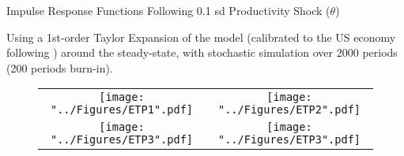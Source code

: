 \documentclass[compress,xcolor=dvipsnames]{beamer}
\begin{document}
\begin{frame}
\begin{footnotesize}
Impulse Response Functions Following 0.1 sd Productivity Shock ($\theta$)\\ \vspace{1mm}
{\tiny Using a 1st-order Taylor Expansion of the model (calibrated to the US economy following \citet{Anzoategui2017}) around the steady-state, with stochastic simulation over 2000 periods (200 periods burn-in).\par}
\end{footnotesize} \vspace{-2mm}
\begin{figure}[h!]
\centering
\begin{adjustbox}{center}
\begin{tabular}{cc}
\texttt{[image: "../Figures/ETP1".pdf]} & %
\texttt{[image: "../Figures/ETP2".pdf]} \\ %
\texttt{[image: "../Figures/ETP3".pdf]} &
\texttt{[image: "../Figures/ETP3".pdf]} %
\end{tabular}
\end{adjustbox}
\end{figure}
\end{frame}
\end{document}
